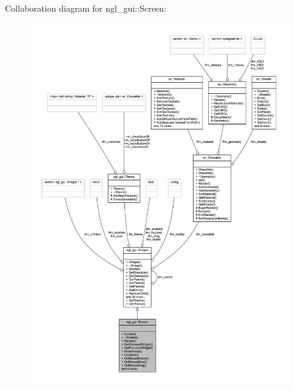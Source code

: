 Collaboration diagram for ngl\+\_\+gui\+:\+:Screen\+:
\nopagebreak
\begin{figure}[H]
\begin{center}
\leavevmode
\includegraphics[width=350pt]{classngl__gui_1_1_screen__coll__graph}
\end{center}
\end{figure}
